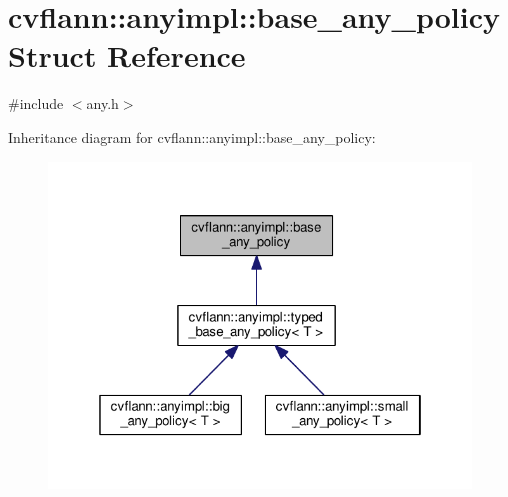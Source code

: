 \hypertarget{structcvflann_1_1anyimpl_1_1base__any__policy}{\section{cvflann\-:\-:anyimpl\-:\-:base\-\_\-any\-\_\-policy Struct Reference}
\label{structcvflann_1_1anyimpl_1_1base__any__policy}
}


{\ttfamily \#include $<$any.\-h$>$}



Inheritance diagram for cvflann\-:\-:anyimpl\-:\-:base\-\_\-any\-\_\-policy\-:\nopagebreak
\begin{figure}[H]
\begin{center}
\leavevmode
\includegraphics[width=321pt]{structcvflann_1_1anyimpl_1_1base__any__policy__inherit__graph}
\end{center}
\end{figure}
